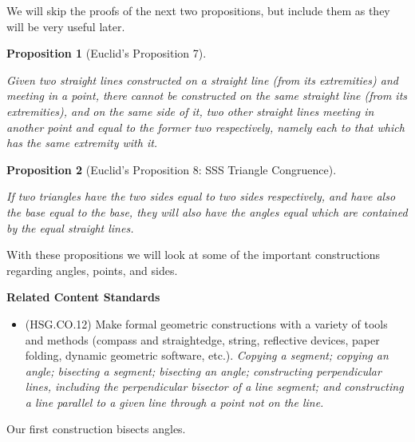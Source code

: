\documentclass[
]{book}
\providecommand{\tightlist}{%
  \setlength{\itemsep}{0pt}\setlength{\parskip}{0pt}}
\newenvironment{standards}{}{}
\newtheorem{proposition}{Proposition}[chapter]
\theoremstyle{definition}
\theoremstyle{definition}
\theoremstyle{definition}
\theoremstyle{definition}
\theoremstyle{remark}
\begin{document}
We will skip the proofs of the next two propositions, but include them as they will be very useful later.

\begin{proposition}[Euclid's Proposition 7]
\protect\hypertarget{prp:prop7}{}\label{prp:prop7}

Given two straight lines constructed on a straight line (from its extremities) and meeting in a point, there cannot be constructed on the same straight line (from its extremities), and on the same side of it, two other straight lines meeting in another point and equal to the former two respectively, namely each to that which has the same extremity with it.

\end{proposition}

\begin{proposition}[Euclid's Proposition 8: SSS Triangle Congruence]
\protect\hypertarget{prp:prop8}{}\label{prp:prop8}

If two triangles have the two sides equal to two sides respectively, and have also the base equal to the base, they will also have the angles equal which are contained by the equal straight lines.

\end{proposition}

With these propositions we will look at some of the important constructions regarding angles, points, and sides.

\begin{standards}

\begin{center}
\textbf{Related Content Standards}

\end{center}

\begin{itemize}
\tightlist
\item
  (HSG.CO.12) Make formal geometric constructions with a variety of tools and methods (compass and straightedge, string, reflective devices, paper folding, dynamic geometric software, etc.). \emph{Copying a segment; copying an angle; bisecting a segment; bisecting an angle; constructing perpendicular lines, including the perpendicular bisector of a line segment; and constructing a line parallel to a given line through a point not on the line.}
\end{itemize}

\end{standards}

Our first construction bisects angles.
\end{document}
